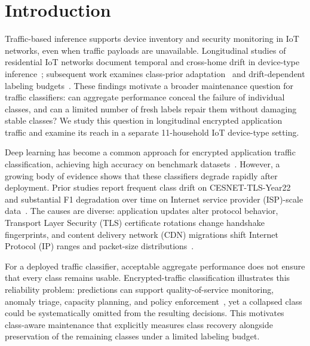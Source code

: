 \documentclass[journal]{IEEEtran}
\begin{document}
\section{Introduction}
\label{sec:intro}

Traffic-based inference supports device inventory and security monitoring in IoT networks, even when traffic payloads are unavailable. Longitudinal studies of residential IoT networks document temporal and cross-home drift in device-type inference~\cite{pashamokhtari2023dynamic}; subsequent work examines class-prior adaptation~\cite{azizi2025labelshift} and drift-dependent labeling budgets~\cite{azizi2026budget}. These findings motivate a broader maintenance question for traffic classifiers: can aggregate performance conceal the failure of individual classes, and can a limited number of fresh labels repair them without damaging stable classes? We study this question in longitudinal encrypted application traffic and examine its reach in a separate 11-household IoT device-type setting.

Deep learning has become a common approach for encrypted application traffic classification, achieving high accuracy on benchmark datasets~\cite{lin2022etbert, zhao2023yatc, pacheco2019towards, wang2019survey}.
However, a growing body of evidence shows that these classifiers degrade rapidly after deployment.
Prior studies report frequent class drift on CESNET-TLS-Year22~\cite{soukup2025drift} and substantial F1 degradation over time on Internet service provider (ISP)-scale data~\cite{malekghaini2023drift}.
The causes are diverse: application updates alter protocol behavior, Transport Layer Security (TLS) certificate rotations change handshake fingerprints, and content delivery network (CDN) migrations shift Internet Protocol (IP) ranges and packet-size distributions~\cite{soukup2025drift, lu2019learning, gama2014survey}.

For a deployed traffic classifier, acceptable aggregate performance does not ensure that every class remains usable. Encrypted-traffic classification illustrates this reliability problem: predictions can support quality-of-service monitoring, anomaly triage, capacity planning, and policy enforcement~\cite{rezaei2019deep,pacheco2019towards}, yet a collapsed class could be systematically omitted from the resulting decisions. This motivates class-aware maintenance that explicitly measures class recovery alongside preservation of the remaining classes under a limited labeling budget.
\end{document}

